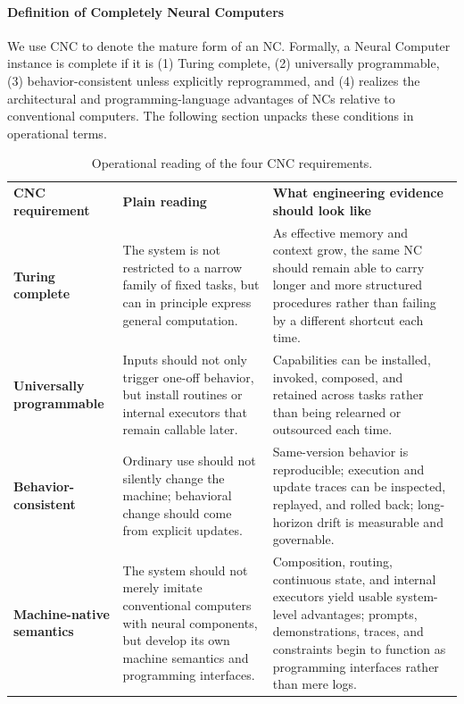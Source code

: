 \paragraph{Definition of Completely Neural Computers} We use CNC to denote the mature form of an NC. Formally, a Neural Computer instance is complete if it is (1) Turing complete, (2) universally programmable, (3) behavior-consistent unless explicitly reprogrammed, and (4) realizes the architectural and programming-language advantages of NCs relative to conventional computers. The following section unpacks these conditions in operational terms.

\begin{table}[h]
  \centering
  \small
  \caption{Operational reading of the four CNC requirements.}
  \label{tab:cnc-operational}
  \setlength{\tabcolsep}{5pt}
  \renewcommand{\arraystretch}{1.08}
  \begin{tabularx}{\linewidth}{l X X}
    \toprule
    \rowcolor{tablewarmhead}
    \textbf{CNC requirement} & \textbf{Plain reading} & \textbf{What engineering evidence should look like} \\
    \textbf{Turing complete} & The system is not restricted to a narrow family of fixed tasks, but can in principle express general computation. & As effective memory and context grow, the same NC should remain able to carry longer and more structured procedures rather than failing by a different shortcut each time. \\
    \textbf{Universally programmable} & Inputs should not only trigger one-off behavior, but install routines or internal executors that remain callable later. & Capabilities can be installed, invoked, composed, and retained across tasks rather than being relearned or outsourced each time. \\
    \textbf{Behavior-consistent} & Ordinary use should not silently change the machine; behavioral change should come from explicit updates. & Same-version behavior is reproducible; execution and update traces can be inspected, replayed, and rolled back; long-horizon drift is measurable and governable. \\
    \textbf{Machine-native semantics} & The system should not merely imitate conventional computers with neural components, but develop its own machine semantics and programming interfaces. & Composition, routing, continuous state, and internal executors yield usable system-level advantages; prompts, demonstrations, traces, and constraints begin to function as programming interfaces rather than mere logs. \\
    \bottomrule
  \end{tabularx}
\end{table}

